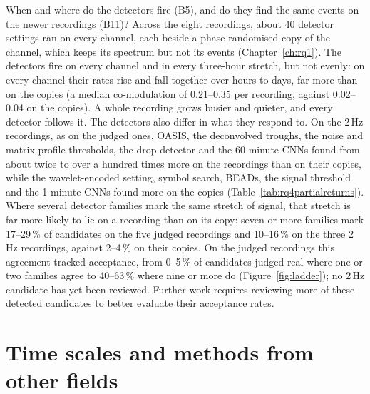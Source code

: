 When and where do the detectors fire (B5), and do they find the same events on the newer recordings (B11)? Across the eight recordings, about 40 detector settings ran on every channel, each beside a phase-randomised copy of the channel, which keeps its spectrum but not its events (Chapter~\ref{ch:rq1}). The detectors fire on every channel and in every three-hour stretch, but not evenly: on every channel their rates rise and fall together over hours to days, far more than on the copies (a median co-modulation of 0.21--0.35 per recording, against 0.02--0.04 on the copies). A whole recording grows busier and quieter, and every detector follows it. The detectors also differ in what they respond to. On the 2\,Hz recordings, as on the judged ones, OASIS, the deconvolved troughs, the noise and matrix-profile thresholds, the drop detector and the 60-minute CNNs found from about twice to over a hundred times more on the recordings than on their copies, while the wavelet-encoded setting, symbol search, BEADs, the signal threshold and the 1-minute CNNs found more on the copies (Table~\ref{tab:rq4partialreturns}). Where several detector families mark the same stretch of signal, that stretch is far more likely to lie on a recording than on its copy: seven or more families mark 17--29\,\% of candidates on the five judged recordings and 10--16\,\% on the three 2\,Hz recordings, against 2--4\,\% on their copies. On the judged recordings this agreement tracked acceptance, from 0--5\,\% of candidates judged real where one or two families agree to 40--63\,\% where nine or more do (Figure~\ref{fig:ladder}); no 2\,Hz candidate has yet been reviewed. Further work requires reviewing more of these detected candidates to better evaluate their acceptance rates.



\section{Time scales and methods from other fields}
\label{sec:rb_methods}

